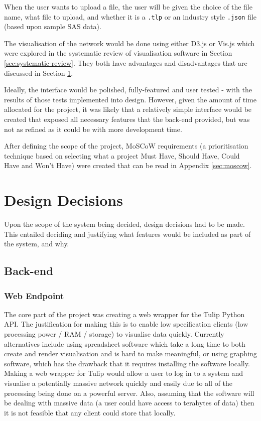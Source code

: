 \documentclass[../dissertation.tex]{subfiles}
\begin{document}
When the user wants to upload a file, the user will be given the choice of the file name, what file to upload, and whether it is a \texttt{.tlp} or an industry style \texttt{.json} file (based upon sample SAS data).

The visualisation of the network would be done using either D3.js or Vis.js which were explored in the systematic review of visualisation software in Section \ref{sec:systematic-review}. They both have advantages and disadvantages that are discussed in Section \ref{sec:designdec}. 

Ideally, the interface would be polished, fully-featured and user tested - with the results of those tests implemented into design. However, given the amount of time allocated for the project, it was likely that a relatively simple interface would be created that exposed all necessary features that the back-end provided, but was not as refined as it could be with more development time.

After defining the scope of the project, MoSCoW requirements (a prioritisation technique based on selecting what a project Must Have, Should Have, Could Have and Won't Have) were created that can be read in Appendix \ref{sec:moscow}.

\section{Design Decisions}
\label{sec:designdec}

Upon the scope of the system being decided, design decisions had to be made. This entailed deciding and justifying what features would be included as part of the system, and why.

\subsection{Back-end}

\subsubsection{Web Endpoint}

The core part of the project was creating a web wrapper for the Tulip Python API. The justification for making this is to enable low specification clients (low processing power / RAM / storage) to visualise data quickly. Currently alternatives include using spreadsheet software which take a long time to both create and render visualisation and is hard to make meaningful, or using graphing software, which has the drawback that it requires installing the software locally. Making a web wrapper for Tulip would allow a user to log in to a system and visualise a potentially massive network quickly and easily due to all of the processing being done on a powerful server. Also, assuming that the software will be dealing with massive data (a user could have access to terabytes of data) then it is not feasible that any client could store that locally.
\end{document}
